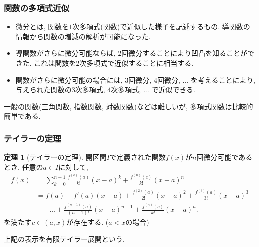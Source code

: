 \documentclass[dvipdfmx,cjk,10.2pt]{beamer}
\theoremstyle{definition}
\newtheorem{Thm}{定理}[section]
\begin{document}
\begin{frame}
\frametitle{関数の多項式近似}


\begin{itemize}
\item 微分とは, 関数を$1$次多項式(関数)で近似した様子を記述するもの. 
導関数の情報から関数の増減の解析が可能になった. 
\item 導関数がさらに微分可能ならば, $2$回微分することにより凹凸を知ることができた. 
これは関数を$2$次多項式で近似することに相当する.
\item 関数がさらに微分可能の場合には, $3$回微分, $4$回微分, ... を考えることにより, 
与えられた関数の$3$次多項式, $4$次多項式, ... で近似できる. 
\end{itemize}
一般の関数(三角関数, 指数関数, 対数関数)などは難しいが, 多項式関数は比較的簡単である. 

\end{frame}








\begin{frame}
\frametitle{テイラーの定理}

\begin{Thm}[テイラーの定理] \label{テイラー}
開区間$I$で定義された関数$f(x)$が$n$回微分可能であるとき. 
任意の$a \in I$に対して, 
 \begin{align*}
f(x) & = \sum_{k=0}^{n-1}\frac{f^{(k)}(a)}{k!}(x-a)^k + \frac{f^{(n)}(c)}{k!}(x-a)^n \\
& =  f(a)+ f'(a)(x-a) + \frac{f^{(2)}(a)}{2!}(x-a)^2  + \frac{f^{(3)}(a)}{3!}(x-a)^3 \\
& \ \ \ + \dots + \frac{f^{(n-1)}(a)}{(n-1)!}(x-a)^{n-1}+\frac{f^{(n)}(c)}{k!}(x-a)^n . 
\end{align*}
を満たす$c \in (a,x)$が存在する. ($a<x$の場合) 
\end{Thm}
上記の表示を有限テイラー展開という.

\end{frame}





\end{document}
